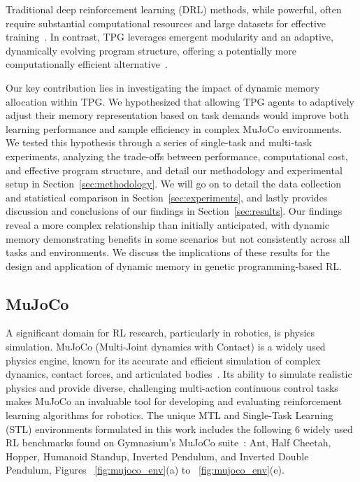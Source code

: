 \documentclass[sigconf]{acmart}
\begin{document}
Traditional deep reinforcement learning (DRL) methods, while powerful, often require substantial computational resources and large datasets for effective training~\cite{Mnih07}. In contrast, TPG leverages emergent modularity and an adaptive, dynamically evolving program structure, offering a potentially more computationally efficient alternative~\cite{Kelly21}.

Our key contribution lies in investigating the impact of dynamic memory allocation within TPG. We hypothesized that allowing TPG agents to adaptively adjust their memory representation based on task demands would improve both learning performance and sample efficiency in complex MuJoCo environments. We tested this hypothesis through a series of single-task and multi-task experiments, analyzing the trade-offs between performance, computational cost, and effective program structure, and detail our methodology and experimental setup in Section~\ref{sec:methodology}. We will go on to detail the data collection and statistical comparison in Section~\ref{sec:experiments}, and lastly provides discussion and conclusions of our findings in Section~\ref{sec:results}. Our findings reveal a more complex relationship than initially anticipated, with dynamic memory demonstrating benefits in some scenarios but not consistently across all tasks and environments. We discuss the implications of these results for the design and application of dynamic memory in genetic programming-based RL.


\subsection{MuJoCo}
A significant domain for RL research, particularly in robotics, is physics 
simulation. MuJoCo (Multi-Joint dynamics with Contact) is a widely used physics 
engine, known for its accurate and efficient simulation of complex dynamics, 
contact forces, and articulated bodies~\cite{Todorov07}. Its ability to simulate realistic 
physics and provide diverse, challenging multi-action continuous control tasks makes MuJoCo an invaluable 
tool for developing and evaluating reinforcement learning algorithms for robotics. 
The unique MTL and Single-Task Learning (STL) environments formulated in this work 
includes the following 6 widely used RL benchmarks found on Gymnasium's 
MuJoCo suite~\cite{Towers07}: Ant, Half Cheetah, Hopper, Humanoid Standup, 
Inverted Pendulum, and Inverted Double Pendulum, Figures ~\ref{fig:mujoco_env}(a) to ~\ref{fig:mujoco_env}(e).
\end{document}
